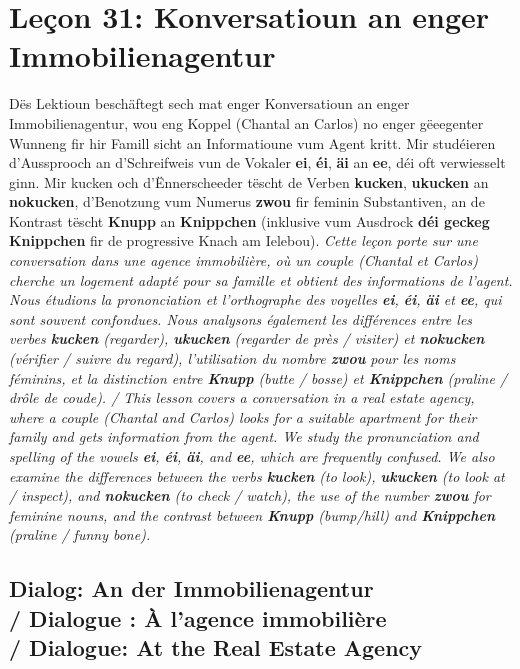 \chapter{Leçon 31: Konversatioun an enger Immobilienagentur}

Dës Lektioun beschäftegt sech mat enger Konversatioun an enger Immobilienagentur, wou eng Koppel (Chantal an Carlos) no enger gëeegenter Wunneng fir hir Famill sicht an Informatioune vum Agent kritt. Mir studéieren d'Aussprooch an d'Schreifweis vun de Vokaler \textbf{ei}, \textbf{éi}, \textbf{äi} an \textbf{ee}, déi oft verwiesselt ginn. Mir kucken och d'Ënnerscheeder tëscht de Verben \textbf{kucken}, \textbf{ukucken} an \textbf{nokucken}, d'Benotzung vum Numerus \textbf{zwou} fir feminin Substantiven, an de Kontrast tëscht \textbf{Knupp} an \textbf{Knippchen} (inklusive vum Ausdrock \textbf{déi geckeg Knippchen} fir de progressive Knach am Ielebou). \textit{Cette leçon porte sur une conversation dans une agence immobilière, où un couple (Chantal et Carlos) cherche un logement adapté pour sa famille et obtient des informations de l'agent. Nous étudions la prononciation et l'orthographe des voyelles \textbf{ei}, \textbf{éi}, \textbf{äi} et \textbf{ee}, qui sont souvent confondues. Nous analysons également les différences entre les verbes \textbf{kucken} (regarder), \textbf{ukucken} (regarder de près / visiter) et \textbf{nokucken} (vérifier / suivre du regard), l'utilisation du nombre \textbf{zwou} pour les noms féminins, et la distinction entre \textbf{Knupp} (butte / bosse) et \textbf{Knippchen} (praline / drôle de coude). / This lesson covers a conversation in a real estate agency, where a couple (Chantal and Carlos) looks for a suitable apartment for their family and gets information from the agent. We study the pronunciation and spelling of the vowels \textbf{ei}, \textbf{éi}, \textbf{äi}, and \textbf{ee}, which are frequently confused. We also examine the differences between the verbs \textbf{kucken} (to look), \textbf{ukucken} (to look at / inspect), and \textbf{nokucken} (to check / watch), the use of the number \textbf{zwou} for feminine nouns, and the contrast between \textbf{Knupp} (bump/hill) and \textbf{Knippchen} (praline / funny bone).}

\vspace{1em}

\section[Dialog: An der Immobilienagentur / Dialogue / Dialogue]{Dialog: An der Immobilienagentur \\/ Dialogue : À l'agence immobilière \\/ Dialogue: At the Real Estate Agency}

